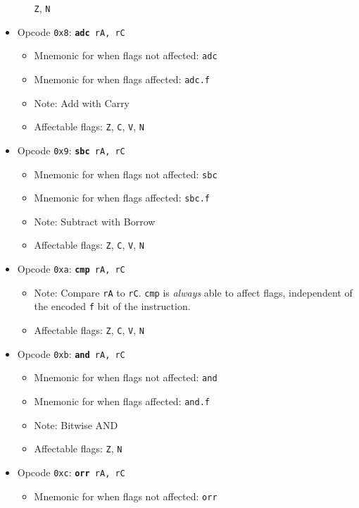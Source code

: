 \documentclass{article}
\begin{document}
\begin{itemize}
\begin{itemize}
				\texttt{Z}, \texttt{N}
		\end{itemize}
		\item Opcode \texttt{0x8}:
			\texttt{\textbf{adc} rA, rC}
		\begin{itemize}
			\item Mnemonic for when flags not affected:  \texttt{adc}
			\item Mnemonic for when flags affected:  \texttt{adc.f}
			\item Note:  Add with Carry
			\item Affectable flags:
				\texttt{Z}, \texttt{C}, \texttt{V}, \texttt{N}
		\end{itemize}
		\item Opcode \texttt{0x9}:
			\texttt{\textbf{sbc} rA, rC}
		\begin{itemize}
			\item Mnemonic for when flags not affected:  \texttt{sbc}
			\item Mnemonic for when flags affected:  \texttt{sbc.f}
			\item Note:  Subtract with Borrow
			\item Affectable flags:
				\texttt{Z}, \texttt{C}, \texttt{V}, \texttt{N}
		\end{itemize}
		\item Opcode \texttt{0xa}:
			\texttt{\textbf{cmp} rA, rC}
		\begin{itemize}
			\item Note:  Compare \texttt{rA} to \texttt{rC}.  \texttt{cmp}
			is \textit{always} able to affect flags, independent of the
			encoded \texttt{f} bit of the instruction.
			\item Affectable flags:
				\texttt{Z}, \texttt{C}, \texttt{V}, \texttt{N}
		\end{itemize}
		\item Opcode \texttt{0xb}:
			\texttt{\textbf{and} rA, rC}
		\begin{itemize}
			\item Mnemonic for when flags not affected:  \texttt{and}
			\item Mnemonic for when flags affected:  \texttt{and.f}
			\item Note:  Bitwise AND
			\item Affectable flags:
				\texttt{Z}, \texttt{N}
		\end{itemize}
		\item Opcode \texttt{0xc}:
			\texttt{\textbf{orr} rA, rC}
		\begin{itemize}
			\item Mnemonic for when flags not affected:  \texttt{orr}

\end{itemize}
\end{itemize}
\end{document}
